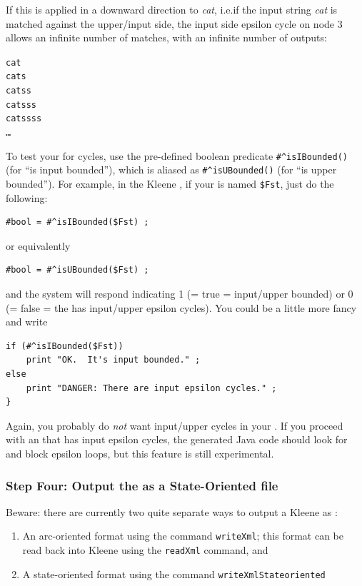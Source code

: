 \noindent
If this \fsm{} is applied in a downward direction to \emph{cat}, i.e.\@ if the input string
\emph{cat} is matched against the upper/input side, the input side epsilon cycle on node 3
allows an infinite number of matches, with an infinite number of outputs:

\begin{alltt}
cat
cats
catss
catsss
catssss
\ldots{}
\end{alltt}

To test your \fsm{} for cycles, use the
pre-defined boolean predicate \verb!#^isIBounded()! (for ``is input bounded''), which is aliased as
\verb!#^isUBounded()! (for ``is upper bounded'').
For example, in the Kleene \gui{}, if your \fsm{} is named \verb!$Fst!, just do the
following:

\begin{Verbatim}
#bool = #^isIBounded($Fst) ;
\end{Verbatim}

\noindent
or equivalently

\begin{Verbatim}
#bool = #^isUBounded($Fst) ;
\end{Verbatim}

\noindent
and the system will respond indicating 1 (= true = input/upper bounded)
or 0 (= false = the \fsm{} has input/upper epsilon cycles).   
You could be a little more fancy and write

\begin{Verbatim}
if (#^isIBounded($Fst))
    print "OK.  It's input bounded." ;
else
    print "DANGER: There are input epsilon cycles." ;
}
\end{Verbatim}

\noindent
Again, you
probably do \emph{not} want input/upper cycles in your \fsm{}.  If you proceed with an \fsm{}
that has input epsilon cycles, the generated Java code should look
for and block epsilon loops, but this feature is still experimental.

\subsubsection{Step Four: Output the \fsm{} as a State-Oriented \xml{} file}

Beware: there are currently two quite separate ways to output a Kleene \fsm{} as \xml{}:

\begin{enumerate}
\item
An arc-oriented format using the command \texttt{writeXml}; this
	\xml{} format can be read back into Kleene using the \texttt{readXml} command, and
\item
A state-oriented \xml{} format using the command \texttt{writeXmlStateoriented}
\end{enumerate}

